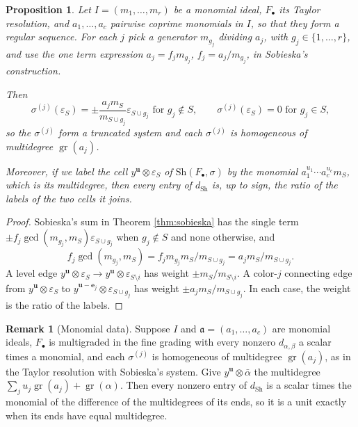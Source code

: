 \documentclass[12pt]{amsart}
\theoremstyle{plain}
\newtheorem{proposition}[theorem]{Proposition}
\theoremstyle{definition}
\newtheorem{remark}[theorem]{Remark}
\newcommand{\F}{ {F_\bullet} }
\newcommand{\gr}{\operatorname{gr}}
\newcommand{\aaa}{\mathfrak{a}}
\newcommand{\Sh}{\mathrm{Sh}}
\newcommand{\eps}{\varepsilon}
\begin{document}
\begin{proposition}\label{prop:labelratio}
    Let $I = (m_1, \dots, m_r)$ be a monomial ideal, $\F$ its Taylor resolution, and $a_1, \dots, a_c$ pairwise coprime monomials in $I$, so that they form a regular sequence. For each $j$ pick a generator $m_{g_j}$ dividing $a_j$, with $g_j \in \{1, \dots, r\}$, and use the one term expression $a_j = f_j m_{g_j}$, $f_j = a_j / m_{g_j}$, in Sobieska's construction.

    Then
    \[
        \sigma^{(j)}(\eps_S) = \pm \frac{a_j m_S}{m_{S \cup g_j}} \eps_{S \cup g_j} \text{ for } g_j \notin S, \qquad \sigma^{(j)}(\eps_S) = 0 \text{ for } g_j \in S,
    \]
    so the $\sigma^{(j)}$ form a truncated system and each $\sigma^{(j)}$ is homogeneous of multidegree $\gr(a_j)$.

    Moreover, if we label the cell $y^{\boldsymbol{u}} \otimes \eps_S$ of $\Sh(\F, \sigma)$ by the monomial $a_1^{u_1} \cdots a_c^{u_c} m_S$, which is its multidegree, then every entry of $d_{\Sh}$ is, up to sign, the ratio of the labels of the two cells it joins.
\end{proposition}

\begin{proof}
Sobieska's sum in Theorem \ref{thm:sobieska} has the single term $\pm f_j \gcd(m_{g_j}, m_S) \eps_{S \cup g_j}$ when $g_j \notin S$ and none otherwise, and $$f_j \gcd(m_{g_j}, m_S) = f_j m_{g_j} m_S / m_{S \cup g_j} = a_j m_S / m_{S \cup g_j}.$$
A level edge $y^{\boldsymbol{u}} \otimes \eps_S \to y^{\boldsymbol{u}} \otimes \eps_{S \setminus i}$ has weight $\pm m_S / m_{S \setminus i}$.
A color-$j$ connecting edge from $y^{\boldsymbol{u}} \otimes \eps_S$ to $y^{\boldsymbol{u} - \boldsymbol{e}_j} \otimes \eps_{S \cup g_j}$ has weight $\pm a_j m_S / m_{S \cup g_j}$. In each case, the weight is the ratio of the labels.
\end{proof}

\begin{remark}[Monomial data]\label{rem:monomial}
    Suppose $I$ and $\aaa=(a_1, \ldots, a_c)$
    are monomial ideals, $\F$ is multigraded in the fine grading with every nonzero $d_{\alpha,\beta}$ a scalar times a monomial, and each $\sigma^{(j)}$ is homogeneous of multidegree $\gr(a_j)$, as in the Taylor resolution with Sobieska's system. Give $y^{\boldsymbol{u}} \otimes \bar\alpha$ the multidegree $\sum_j u_j \gr(a_j) + \gr(\alpha)$. Then every nonzero entry of $d_{\Sh}$ is a scalar times the monomial of the difference of the multidegrees of its ends, so it is a unit exactly when its ends have equal multidegree. 
\end{remark}
\end{document}
